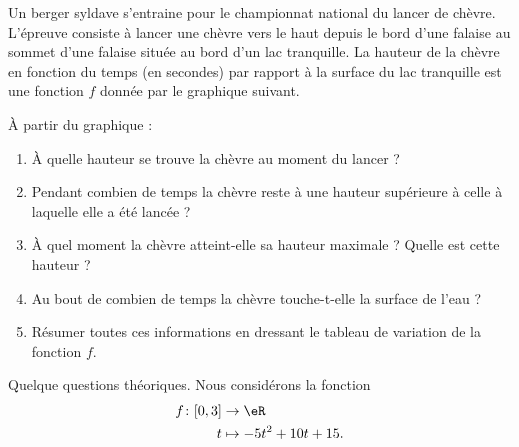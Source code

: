 
\begin{exercice}\label{exosmath-0238}

    Un berger syldave s'entraine pour le championnat national du lancer de chèvre. L'épreuve consiste à lancer une chèvre vers le haut depuis le bord d'une falaise au sommet d'une falaise située au bord d'un lac tranquille. La hauteur de la chèvre en fonction du temps (en secondes) par rapport à la surface du lac tranquille est une fonction \( f\) donnée par le graphique suivant.

    \begin{center}

    \end{center}
    À partir du graphique :
    \begin{enumerate}
        \item
            À quelle hauteur se trouve la chèvre au moment du lancer ?
        \item
            Pendant combien de temps la chèvre reste à une hauteur supérieure à celle à laquelle elle a été lancée ?
        \item
            À quel moment la chèvre atteint-elle sa hauteur maximale ? Quelle est cette hauteur ?
        \item
            Au bout de combien de temps la chèvre touche-t-elle la surface de l'eau ?
        \item
            Résumer toutes ces informations en dressant le tableau de variation de la fonction \( f\).
    \end{enumerate}
    Quelque questions théoriques. Nous considérons la fonction
            \begin{equation}
                \begin{aligned}
                    f\colon \mathopen[ 0 , 3 \mathclose]&\to \eR \\
                    t&\mapsto -5t^2+10t+15. 
                \end{aligned}
            \end{equation}
            

\end{exercice}
